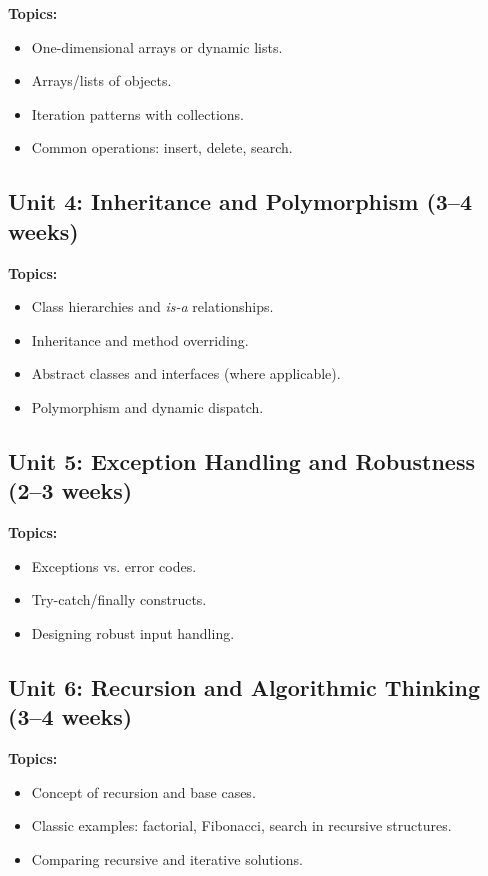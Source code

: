 \documentclass[12pt,oneside]{book}
\begin{document}
\textbf{Topics:}
\begin{itemize}
    \item One-dimensional arrays or dynamic lists.
    \item Arrays/lists of objects.
    \item Iteration patterns with collections.
    \item Common operations: insert, delete, search.
\end{itemize}

\subsection{Unit 4: Inheritance and Polymorphism (3--4 weeks)}

\textbf{Topics:}
\begin{itemize}
    \item Class hierarchies and \textit{is-a} relationships.
    \item Inheritance and method overriding.
    \item Abstract classes and interfaces (where applicable).
    \item Polymorphism and dynamic dispatch.
\end{itemize}

\subsection{Unit 5: Exception Handling and Robustness (2--3 weeks)}

\textbf{Topics:}
\begin{itemize}
    \item Exceptions vs. error codes.
    \item Try-catch/finally constructs.
    \item Designing robust input handling.
\end{itemize}

\subsection{Unit 6: Recursion and Algorithmic Thinking (3--4 weeks)}

\textbf{Topics:}
\begin{itemize}
    \item Concept of recursion and base cases.
    \item Classic examples: factorial, Fibonacci, search in recursive structures.
    \item Comparing recursive and iterative solutions.
\end{itemize}
\end{document}
